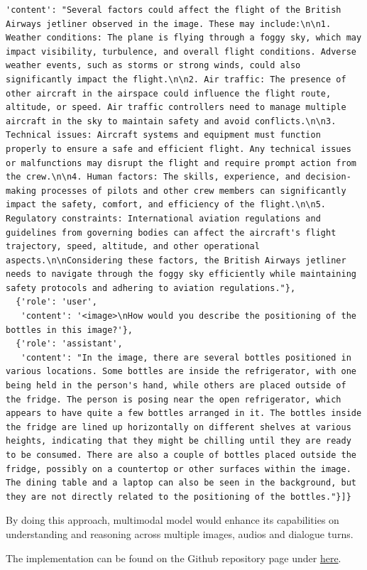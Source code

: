 \documentclass[preprint]{article}
\begin{document}
\begin{lstlisting}[breaklines=true]
   'content': "Several factors could affect the flight of the British Airways jetliner observed in the image. These may include:\n\n1. Weather conditions: The plane is flying through a foggy sky, which may impact visibility, turbulence, and overall flight conditions. Adverse weather events, such as storms or strong winds, could also significantly impact the flight.\n\n2. Air traffic: The presence of other aircraft in the airspace could influence the flight route, altitude, or speed. Air traffic controllers need to manage multiple aircraft in the sky to maintain safety and avoid conflicts.\n\n3. Technical issues: Aircraft systems and equipment must function properly to ensure a safe and efficient flight. Any technical issues or malfunctions may disrupt the flight and require prompt action from the crew.\n\n4. Human factors: The skills, experience, and decision-making processes of pilots and other crew members can significantly impact the safety, comfort, and efficiency of the flight.\n\n5. Regulatory constraints: International aviation regulations and guidelines from governing bodies can affect the aircraft's flight trajectory, speed, altitude, and other operational aspects.\n\nConsidering these factors, the British Airways jetliner needs to navigate through the foggy sky efficiently while maintaining safety protocols and adhering to aviation regulations."},
  {'role': 'user',
   'content': '<image>\nHow would you describe the positioning of the bottles in this image?'},
  {'role': 'assistant',
   'content': "In the image, there are several bottles positioned in various locations. Some bottles are inside the refrigerator, with one being held in the person's hand, while others are placed outside of the fridge. The person is posing near the open refrigerator, which appears to have quite a few bottles arranged in it. The bottles inside the fridge are lined up horizontally on different shelves at various heights, indicating that they might be chilling until they are ready to be consumed. There are also a couple of bottles placed outside the fridge, possibly on a countertop or other surfaces within the image. The dining table and a laptop can also be seen in the background, but they are not directly related to the positioning of the bottles."}]}
\end{lstlisting}

By doing this approach, multimodal model would enhance its capabilities on understanding and reasoning across multiple images, audios and dialogue turns.

The implementation can be found on the Github repository page under \href{https://github.com/mesolitica/multimodal-LLM/tree/master/prepare-dataset}{here}.
\end{document}
